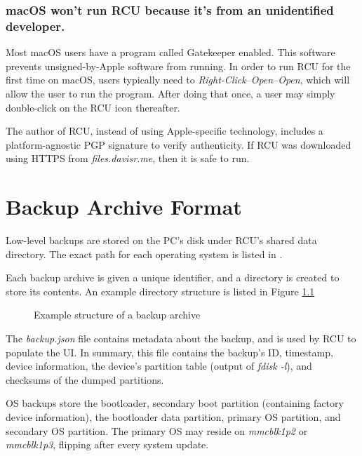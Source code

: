 \documentclass{memoir}
\begin{document}
{\subsection{macOS won't run RCU because it's from an unidentified developer.}
Most macOS users have a program called Gatekeeper enabled. This software prevents unsigned-by-Apple software from running. In order to run RCU for the first time on macOS, users typically need to \textit{Right-Click}--\textit{Open}--\textit{Open}, which will allow the user to run the program. After doing that once, a user may simply double-click on the RCU icon thereafter.

The author of RCU, instead of using Apple-specific technology, includes a platform-agnostic PGP signature to verify authenticity. If RCU was downloaded using HTTPS from \textit{files.davisr.me}, then it is safe to run.






\newpage
\appendix

\chapter{Backup Archive Format}
\label{sec:backuparchiveformat}
Low-level backups are stored on the PC's disk under RCU's shared data directory. The exact path for each operating system is listed in .

Each backup archive is given a unique identifier, and a directory is created to store its contents. An example directory structure is listed in Figure \ref{fig:backupstructure}

\begin{figure}[h]
\caption{Example structure of a backup archive}
\label{fig:backupstructure}
\end{figure}

The \textit{backup.json} file contains metadata about the backup, and is used by RCU to populate the UI. In summary, this file contains the backup's ID, timestamp, device information, the device's partition table (output of \textit{fdisk -l}), and checksums of the dumped partitions.

OS backups store the bootloader, secondary boot partition (containing factory device information), the bootloader data partition, primary OS partition, and secondary OS partition. The primary OS may reside on \textit{mmcblk1p2} or \textit{mmcblk1p3}, flipping after every system update.

}
\end{document}
